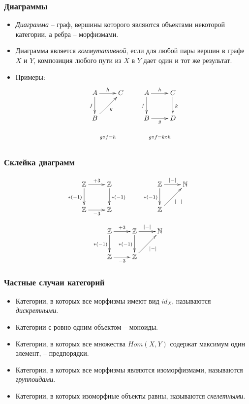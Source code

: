 \documentclass{beamer}
\begin{document}
\begin{frame}
\frametitle{Диаграммы}
\begin{itemize}
\item \emph{Диаграмма} -- граф, вершины которого являются объектами некоторой категории, а ребра -- морфизмами.
\item Диаграмма является \emph{коммутативной}, если для любой пары вершин в графе $X$ и $Y$, композиция любого пути из $X$ в $Y$ дает один и тот же результат.
\item Примеры:
\[ \xymatrix{ A \ar[r]^h \ar[d]_f & C \\
              B \ar[ur]_g \\
              \ar@{}[r]^{g \circ f = h} &
            }
\qquad
\xymatrix{ A \ar[r]^h \ar[d]_f & C \ar[d]^k \\
           B \ar[r]_g & D \\
           \ar@{}[r]^{g \circ f = k \circ h} &
         } \]
\end{itemize}
\end{frame}

\begin{frame}
\frametitle{Склейка диаграмм}
\[ \xymatrix{ \mathbb{Z} \ar[r]^{+ 3} \ar[d]_{* (-1)} & \mathbb{Z} \ar[d]^{* (-1)} \\
              \mathbb{Z} \ar[r]_{- 3} & \mathbb{Z}
            }
\qquad
\xymatrix{ \mathbb{Z} \ar[r]^{|-|} \ar[d]_{* (-1)} & \mathbb{N} \\
              \mathbb{Z} \ar[ur]_{|-|}
            } \]
\[ \xymatrix{ \mathbb{Z} \ar[r]^{+ 3} \ar[d]_{* (-1)} & \mathbb{Z} \ar[d]_{* (-1)} \ar[r]^{|-|} & \mathbb{N} \\
              \mathbb{Z} \ar[r]_{- 3} & \mathbb{Z} \ar[ur]_{|-|}
            } \]
\end{frame}

\begin{frame}
\frametitle{Частные случаи категорий}
\begin{itemize}
\item Категории, в которых все морфизмы имеют вид $id_X$, называются \emph{дискретными}.
\item Категории с ровно одним объектом -- моноиды.
\item Категории, в которых все множества $Hom(X, Y)$ содержат максимум один элемент, -- предпорядки.
\item Категории, в которых все морфизмы являются изоморфизмами, называются \emph{группоидами}.
\item Категории, в которых изоморфные объекты равны, называются \emph{скелетными}.
\end{itemize}
\end{frame}
\end{document}
